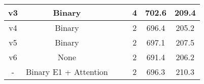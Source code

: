 \documentclass[letterpaper, 10 pt, conference]{ieeeconf}  \usepackage{geometry}
\begin{document}
\begin{table}[t]
{\begin{tabular}{ccccccc}
			v3                                                     & Binary                                                                              & \checkmark                                                                                                       &                                                                                                         & 4                                                       & 702.6                                                        & 209.4                                                       \\ \hline
			v4                                                     & Binary                                                                              & \checkmark                                                                                                       & \checkmark                                                                                                     & 2                                                       & 696.4                                                        & 205.2                                                       \\
			v5                                                     & Binary                                                                              &                                                                                                           &                                                                                                         & 2                                                       & 697.1                                                        & 207.5                                                       \\
			v6                                                     & None                                                                                & \checkmark                                                                                                       &                                                                                                         & 2                                                       & 691.4                                                        & 206.2                                                       \\ \hline
			-                                                      & Binary E1 + Attention                                                            &                                                                                                           & \checkmark                                                                                                     & 2                                                       & 696.3                                                        & 210.3                                                       \\

\end{tabular}}
\end{table}
\end{document}
